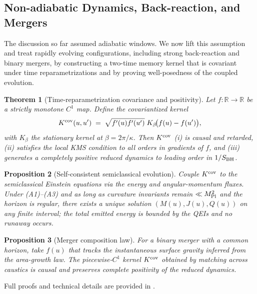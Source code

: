 \documentclass[aps,prd,preprint,onecolumn,superscriptaddress,nofootinbib,longbibliography,floatfix,11pt,showpacs,showkeys]{revtex4-2}
\theoremstyle{plain}
\newtheorem{theorem}{Theorem}
\newtheorem{proposition}[theorem]{Proposition}
\theoremstyle{definition}
\theoremstyle{remark}
\begin{document}
\subsection{Non-adiabatic Dynamics, Back-reaction, and Mergers}
\label{sec:nonadiabatic-main}
The discussion so far assumed adiabatic windows. We now lift this assumption and treat rapidly evolving configurations, including strong back-reaction and binary mergers, by constructing a two-time memory kernel that is covariant under time reparametrizations and by proving well-posedness of the coupled evolution.

\begin{theorem}[Time-reparametrization covariance and positivity]
\label{thm:nonadiabatic-covariance}
Let $f:\mathbb{R}\to\mathbb{R}$ be a strictly monotone $C^1$ map. Define the covariantized kernel
\[
K^{\rm cov}(u,u')\;=\;\sqrt{f'(u)f'(u')}\;K_\beta\!\big(f(u)-f(u')\big),
\]
with $K_\beta$ the stationary kernel at $\beta=2\pi/\kappa$. Then $K^{\rm cov}$ (i) is causal and retarded, (ii) satisfies the local KMS condition to all orders in gradients of $f$, and (iii) generates a completely positive reduced dynamics to leading order in $1/S_{\rm BH}$. 
\end{theorem}

\begin{proposition}[Self-consistent semiclassical evolution]\label{prop:self-consistent}
Couple $K^{\rm cov}$ to the semiclassical Einstein equations via the energy and angular-momentum fluxes. Under (A1)--(A3) and as long as curvature invariants remain $\ll M_{\rm Pl}^2$ and the horizon is regular, there exists a unique solution $(M(u),J(u),Q(u))$ on any finite interval; the total emitted energy is bounded by the QEIs and no runaway occurs.
\end{proposition}

\begin{proposition}[Merger composition law]\label{prop:merger}
For a binary merger with a common horizon, take $f(u)$ that tracks the instantaneous surface gravity inferred from the area-growth law. The piecewise-$C^1$ kernel $K^{\rm cov}$ obtained by matching across caustics is causal and preserves complete positivity of the reduced dynamics.
\end{proposition}

Full proofs and technical details are provided in .
\end{document}
